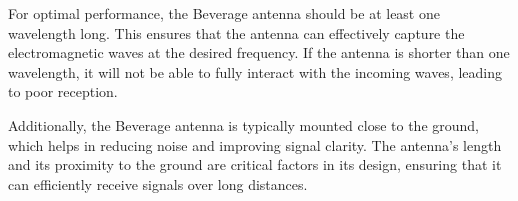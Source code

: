 For optimal performance, the Beverage antenna should be at least one wavelength long. This ensures that the antenna can effectively capture the electromagnetic waves at the desired frequency. If the antenna is shorter than one wavelength, it will not be able to fully interact with the incoming waves, leading to poor reception.

Additionally, the Beverage antenna is typically mounted close to the ground, which helps in reducing noise and improving signal clarity. The antenna's length and its proximity to the ground are critical factors in its design, ensuring that it can efficiently receive signals over long distances.

